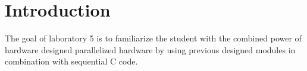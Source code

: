\section{Introduction}\label{sec: Introduction}
The goal of laboratory 5 is to familiarize the student with the combined power of hardware designed parallelized hardware by using previous designed modules in combination with sequential C code.
